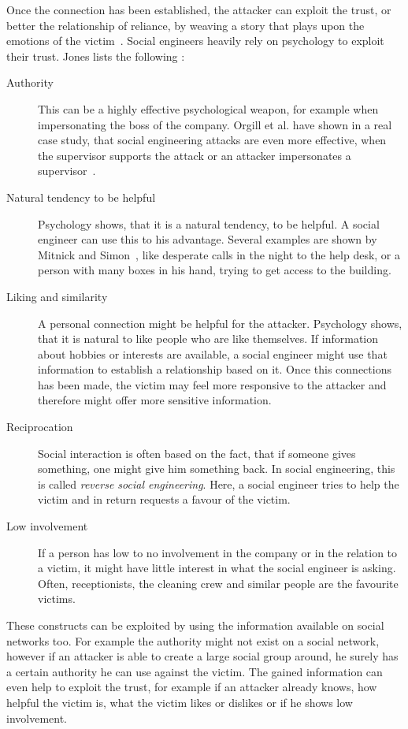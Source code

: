 Once the connection has been established, the attacker can exploit the trust,
or better the relationship of reliance, by \glqq{}weaving a story that plays
upon the emotions of the victim\grqq{}~\cite{thornburgh2004}. Social engineers
heavily rely on psychology to exploit their trust. Jones lists the following
\cite{jones2004}:

\begin{description}

\item[Authority] This can be a highly effective psychological weapon, for
  example when impersonating the boss of the company. Orgill et al. have
  shown in a real case study, that social engineering attacks are even more
  effective, when the supervisor supports the attack or an attacker
  impersonates a supervisor~\cite{orgill2004}.
\item[Natural tendency to be helpful] Psychology shows, that it is a natural
  tendency, to be helpful. A social engineer can use this to his advantage.
  Several examples are shown by Mitnick and Simon~\cite{mitnick2003}, like
  desperate calls in the night to the help desk, or a person with many boxes
  in his hand, trying to get access to the building.
\item[Liking and similarity] A personal connection might be helpful for the
  attacker. Psychology shows, that it is natural to like people who are like
  themselves. If information about hobbies or interests are available, a social
  engineer might use that information to establish a relationship based on 
  it. Once this connections has been made, the victim may feel more
  responsive to the attacker and therefore might offer more sensitive
  information.
\item[Reciprocation] Social interaction is often based on the fact, that if
  someone gives something, one might give him something back. In social
  engineering, this is called \textit{reverse social engineering}. Here, a
  social engineer tries to help the victim and in return requests a favour of
  the victim.
\item[Low involvement] If a person has low to no involvement in the company or
  in the relation to a victim, it might have little interest in what the social engineer is
  asking. Often, receptionists, the cleaning crew and similar people are the
  favourite victims.
\end{description}

These constructs can be exploited by using the information available on social
networks too. For example the authority might not exist on a social network,
however if an attacker is able to create a large social group around, he surely
has a certain authority he can use against the victim. The gained information
can even help to exploit the trust, for example if an attacker already knows,
how helpful the victim is, what the victim likes or dislikes or if he shows low
involvement.

